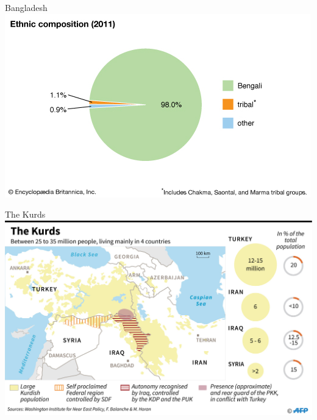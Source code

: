 \documentclass[handout]{beamer}
\begin{document}
\begin{frame}{\LARGE Bangladesh}
    \centering
\includegraphics[width=\textwidth,height=0.8\textheight,keepaspectratio]{Bangladesh.jpg}
\end{frame}

\begin{frame}{\LARGE The Kurds}
    \centering
\includegraphics[width=\textwidth,height=0.8\textheight,keepaspectratio]{Kurds.jpg}
\end{frame}
\end{document}
